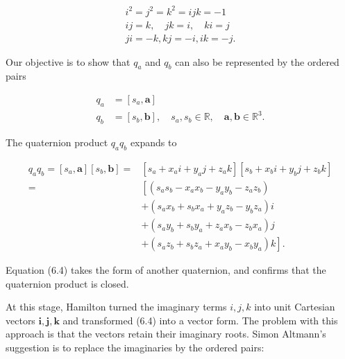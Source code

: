 $$
    \begin{gathered}
        i^{2}=j^{2}=k^{2}=i j k=-1 \\
        i j=k, \quad j k=i, \quad k i=j \\
        j i=-k, k j=-i, i k=-j .
    \end{gathered}
$$

Our objective is to show that $q_{a}$ and $q_{b}$ can also be represented by the ordered pairs

$$
    \begin{aligned}
        q_{a} & =\left[s_{a}, \mathbf{a}\right]                                                                                       \\
        q_{b} & =\left[s_{b}, \mathbf{b}\right], \quad s_{a}, s_{b} \in \mathbb{R}, \quad \mathbf{a}, \mathbf{b} \in \mathbb{R}^{3} .
    \end{aligned}
$$

The quaternion product $q_{a} q_{b}$ expands to

$$
    \begin{aligned}
        q_{a} q_{b}=\left[s_{a}, \mathbf{a}\right]\left[s_{b}, \mathbf{b}\right]= & {\left[s_{a}+x_{a} i+y_{a} j+z_{a} k\right]\left[s_{b}+x_{b} i+y_{b} j+z_{b} k\right] } \\
        =                                                                         & {\left[\left(s_{a} s_{b}-x_{a} x_{b}-y_{a} y_{b}-z_{a} z_{b}\right)\right.}             \\
                                                                                  & +\left(s_{a} x_{b}+s_{b} x_{a}+y_{a} z_{b}-y_{b} z_{a}\right) i                         \\
                                                                                  & +\left(s_{a} y_{b}+s_{b} y_{a}+z_{a} x_{b}-z_{b} x_{a}\right) j                         \\
                                                                                  & \left.+\left(s_{a} z_{b}+s_{b} z_{a}+x_{a} y_{b}-x_{b} y_{a}\right) k\right] .
    \end{aligned}
$$

Equation (6.4) takes the form of another quaternion, and confirms that the quaternion product is closed.

At this stage, Hamilton turned the imaginary terms $i, j, k$ into unit Cartesian vectors $\mathbf{i}, \mathbf{j}, \mathbf{k}$ and transformed (6.4) into a vector form. The problem with this approach is that the vectors retain their imaginary roots. Simon Altmann's suggestion is to replace the imaginaries by the ordered pairs:

